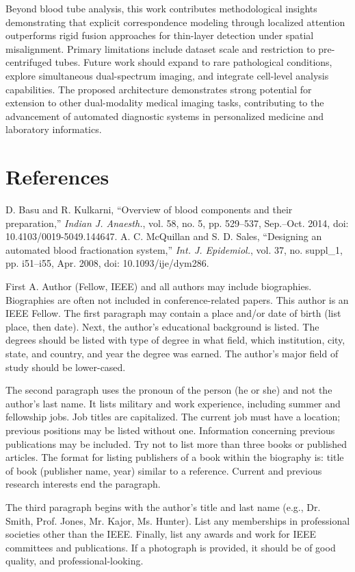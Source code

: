 \documentclass[journal,twoside,web]{ieeecolor}
\begin{document}
Beyond blood tube analysis, this work contributes methodological insights demonstrating that explicit correspondence modeling through localized attention outperforms rigid fusion approaches for thin-layer detection under spatial misalignment. Primary limitations include dataset scale and restriction to pre-centrifuged tubes. Future work should expand to rare pathological conditions, explore simultaneous dual-spectrum imaging, and integrate cell-level analysis capabilities. The proposed architecture demonstrates strong potential for extension to other dual-modality medical imaging tasks, contributing to the advancement of automated diagnostic systems in personalized medicine and laboratory informatics.

\section*{References}

\begin{thebibliography}{00}
 D. Basu and R. Kulkarni, ``Overview of blood components and their preparation,'' {\it Indian J. Anaesth.}, vol. 58, no. 5, pp. 529--537, Sep.--Oct. 2014, doi: 10.4103/0019-5049.144647.
 A. C. McQuillan and S. D. Sales, ``Designing an automated blood fractionation system,'' {\it Int. J. Epidemiol.}, vol. 37, no. suppl\_1, pp. i51--i55, Apr. 2008, doi: 10.1093/ije/dym286.
\end{thebibliography}

\begin{IEEEbiography}{First A. Author} (Fellow, IEEE) and all authors may include 
biographies. Biographies are
often not included in conference-related papers.
This author is an IEEE Fellow. The first paragraph
may contain a place and/or date of birth (list
place, then date). Next, the author’s educational
background is listed. The degrees should be listed
with type of degree in what field, which institution,
city, state, and country, and year the degree was
earned. The author’s major field of study should
be lower-cased.

The second paragraph uses the pronoun of the person (he or she) and
not the author’s last name. It lists military and work experience, including
summer and fellowship jobs. Job titles are capitalized. The current job must
have a location; previous positions may be listed without one. Information
concerning previous publications may be included. Try not to list more than
three books or published articles. The format for listing publishers of a book
within the biography is: title of book (publisher name, year) similar to a
reference. Current and previous research interests end the paragraph.

The third paragraph begins with the author’s title and last name (e.g.,
Dr. Smith, Prof. Jones, Mr. Kajor, Ms. Hunter). List any memberships in
professional societies other than the IEEE. Finally, list any awards and work
for IEEE committees and publications. If a photograph is provided, it should
be of good quality, and professional-looking.
\end{IEEEbiography}
\end{document}
